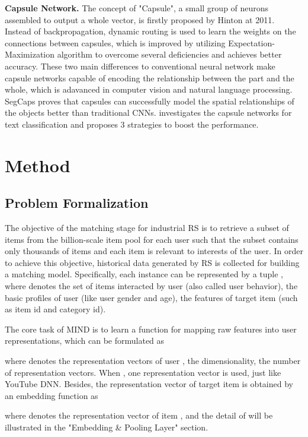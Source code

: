 \documentclass[sigconf]{acmart}
\begin{document}
\textbf{Capsule Network.}
The concept of "Capsule", a small group of neurons assembled to output a whole vector, is firstly proposed by Hinton \cite{hinton2011transforming} at 2011.
Instead of backpropagation, dynamic routing \cite{sabour2017dynamic} is used to learn the weights on the connections between capsules, which is improved by utilizing Expectation-Maximization algorithm \cite{hinton2018matrix} to overcome several deficiencies and achieves better accuracy.
These two main differences to conventional neural network make capsule networks capable of encoding the relationship between the part and the whole, which is adavanced in computer vision and natural language processing.
SegCaps \cite{lalonde2018capsules} proves that capsules can successfully model the spatial relationships of the objects better than traditional CNNs.
\cite{zhao2018investigating} investigates the capsule networks for text classification and proposes 3 strategies to boost the performance.

\section{Method}

\subsection{Problem Formalization}
The objective of the matching stage for industrial RS is to retrieve a subset of items from the billion-scale item pool  for each user  such that the subset contains only thousands of items and each item is relevant to interests of the user.
In order to achieve this objective, historical data generated by RS is collected for building a matching model.
Specifically, each instance can be represented by a tuple , where  denotes the set of items interacted by user  (also called user behavior),  the basic profiles of user  (like user gender and age),  the features of target item (such as item id and category id).

The core task of MIND is to learn a function for mapping raw features into user representations, which can be formulated as

where  denotes the representation vectors of user ,  the dimensionality,  the number of representation vectors.
When , one representation vector is used, just like YouTube DNN.
Besides, the representation vector of target item  is obtained by an embedding function as

where  denotes the representation vector of item , and the detail of  will be illustrated in the "Embedding \& Pooling Layer" section.
\end{document}
